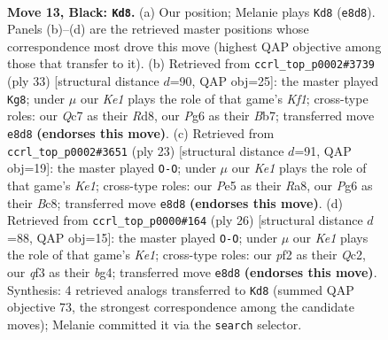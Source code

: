 \documentclass[11pt]{article}
\begin{document}
\begin{figure}[p]
\label{fig:thought-m23}
\end{figure}

\clearpage

\begin{figure}[p]\centering
\begin{subfigure}{0.46\textwidth}\centering
\resizebox{\linewidth}{!}{%
\newchessgame
\chessboard[
  setfen={rnb1k2r/ppq1p1bp/3p2p1/4p1Pn/4P3/2N1BQ2/PPP2P1P/2KR1BR1 b kq - 2 13},
  showmover=false,
  pgfstyle=straightmove, color=movearrow, markmove={e8-d8}
]}
\caption{}
\end{subfigure}\hfill
\begin{subfigure}{0.46\textwidth}\centering
\resizebox{\linewidth}{!}{%
\newchessgame
\chessboard[
  setfen={3r1k1r/1bq2pp1/ppp2n1p/2b1pP2/P3P3/1P1B1Q2/2PB1NPP/R4R1K b - - 2 17},
  showmover=false,
  pgfstyle=straightmove, color=movearrow, markmove={f8-g8}
]}
\caption{}
\end{subfigure}
\\[4pt]
\begin{subfigure}{0.46\textwidth}\centering
\resizebox{\linewidth}{!}{%
\newchessgame
\chessboard[
  setfen={r1b1k2r/1p2qppp/2pb1n2/p3p3/P1B1P3/4BQ1P/1PPN1PP1/R3K2R b KQkq - 1 12},
  showmover=false,
  pgfstyle=straightmove, color=movearrow, markmove={e8-g8}
]}
\caption{}
\end{subfigure}\hfill
\begin{subfigure}{0.46\textwidth}\centering
\resizebox{\linewidth}{!}{%
\newchessgame
\chessboard[
  setfen={r4rk1/ppp1qp1p/2n2bpP/4p3/4P1b1/2PP1NP1/P1Q2PB1/R1B1K2R w KQ - 1 14},
  showmover=false,
  pgfstyle=straightmove, color=movearrow, markmove={e1-g1}
]}
\caption{}
\end{subfigure}
\caption{\textbf{Move 13, Black: \texttt{Kd8}.} (a) Our position; Melanie plays \texttt{Kd8} (\texttt{e8d8}). Panels (b)--(d) are the retrieved master positions whose correspondence most drove this move (highest QAP objective among those that transfer to it). (b) Retrieved from \texttt{ccrl\_top\_p0002\#3739} (ply 33) [structural distance $d$=90, QAP obj=25]: the master played \texttt{Kg8}; under $\mu$ our \emph{Ke1} plays the role of that game's \emph{Kf1}; cross-type roles: our \emph{Q}c7 as their \emph{R}d8, our \emph{P}g6 as their \emph{B}b7; transferred move \texttt{e8d8} \textbf{(endorses this move)}. (c) Retrieved from \texttt{ccrl\_top\_p0002\#3651} (ply 23) [structural distance $d$=91, QAP obj=19]: the master played \texttt{O-O}; under $\mu$ our \emph{Ke1} plays the role of that game's \emph{Ke1}; cross-type roles: our \emph{P}e5 as their \emph{R}a8, our \emph{P}g6 as their \emph{B}c8; transferred move \texttt{e8d8} \textbf{(endorses this move)}. (d) Retrieved from \texttt{ccrl\_top\_p0000\#164} (ply 26) [structural distance $d$=88, QAP obj=15]: the master played \texttt{O-O}; under $\mu$ our \emph{Ke1} plays the role of that game's \emph{Ke1}; cross-type roles: our \emph{p}f2 as their \emph{Q}c2, our \emph{q}f3 as their \emph{b}g4; transferred move \texttt{e8d8} \textbf{(endorses this move)}. Synthesis: 4 retrieved analogs transferred to \texttt{Kd8} (summed QAP objective 73, the strongest correspondence among the candidate moves); Melanie committed it via the \texttt{search} selector.}

\end{figure}
\end{document}
